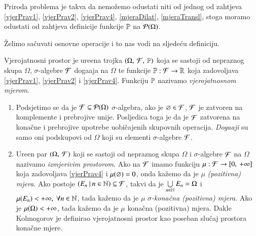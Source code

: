 Priroda problema je takva da nemo\v zemo odustati niti od jednog od
zahtjeva \eqref{vjerPrav1}, \eqref{vjerPrav2}, \eqref{vjerPrav4},
\eqref{mjeraDilat}, \eqref{mjeraTransl}, stoga moramo odustati od
zahtjeva definicije funkcije $\mathbb{P}$ na $\mathcal{P}({\Omega})$.

\v Zelimo sa\v cuvati osnovne operacije i to nas vodi na sljede\' cu
definiciju.

\begin{defn}
    Vjerojatnosni prostor je ure\dj ena trojka
    $(\Omega, \: \mathcal{F}, \: \mathbb{P})$ koja se sastoji od nepraznog skupa
    $\Omega$, $\sigma$-algebre $\mathcal{F}$ doga\dj aja na $\Omega$ te
    funkcije $\mathbb{P}: \mathcal{F} \to \mathbb{R}$ koja zadovoljava \eqref{vjerPrav1},
    \eqref{vjerPrav2} i \eqref{vjerPrav4}.
    Funkciju $\mathbb{P}$ nazivamo \emph{vjerojatnosnom mjerom}.
\end{defn}

\begin{nap}
    \begin{enumerate}[label=(\alph*)]
        \item Podsjetimo se da je $\mathcal{F} \subseteq \mathcal{P}({\Omega})$
            $\sigma$-algebra, ako je $\varnothing \in \mathcal{F}$, $\mathcal{F}$ je
            zatvoren na komplemente i prebrojive unije. Posljedica
            toga je da je $\mathcal{F}$ zatvorena na kona\v cne i prebrojive
            upotrebe uobi\v cajenih skupovnih operacija.
            \emph{Doga\dj aji}  su samo oni podskupovi od $\Omega$
            koji su elementi $\sigma$-algebre $\mathcal{F}$.
        \item Ure\dj en par $(\Omega, \: \mathcal{F})$ koji se sastoji od
            nepraznog skupa $\Omega$ i $\sigma$-algebre $\mathcal{F}$ na
            $\Omega$ nazivamo \emph{izmjerivim prostorom}.
            Ako na $\mathcal{F}$ imamo funkciju $\mu : \mathcal{F} \to
            [{0}, \:{+ \infty}]$ koja zadovoljava \eqref{vjerPrav4}
            i $\mu({\varnothing}) = 0$, onda ka\v zemo da je $\mu$
            \emph{(pozitivna) mjera}.
            Ako postoje $({E_n} \: | \: {n \in \mathbb{N}}) \subseteq \mathcal{F}$, takvi da
            je $\bigcup\limits_{n \in \mathbb{N}}^{} E_n = \Omega$ i $\mu({E_n}) <
            +\infty, \; \forall n \in \mathbb{N}$, tada ka\v zemo da je $\mu$
            \emph{$\sigma$-kona\v cna (pozitivna) mjera}.
            Ako je $\mu({\Omega}) < +\infty$, tada ka\v zemo da je
            $\mu$ kona\v cna (pozitivna) mjera.
            Dakle Kolmogorov je definirao vjerojatnosni prostor kao
            poseban slu\v caj prostora kona\v cne mjere.
    \end{enumerate}
\end{nap}